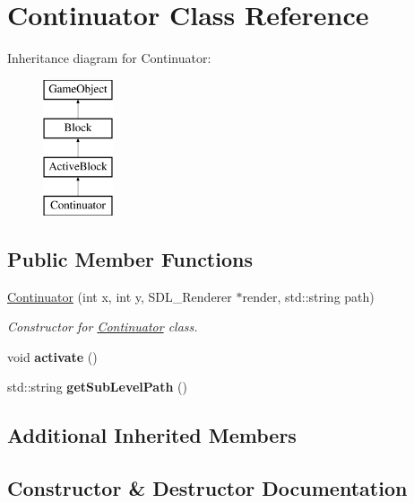 \hypertarget{class_continuator}{}\section{Continuator Class Reference}
\label{class_continuator}
Inheritance diagram for Continuator\+:\begin{figure}[H]
\begin{center}
\leavevmode
\includegraphics[height=4.000000cm]{class_continuator}
\end{center}
\end{figure}
\subsection*{Public Member Functions}
\begin{DoxyCompactItemize}
\item 
\hyperlink{class_continuator_a0983a0dece1cc4bdc524c6d81e0e2564}{Continuator} (int x, int y, S\+D\+L\+\_\+\+Renderer $\ast$render, std\+::string path)
\begin{DoxyCompactList}\small\item\em Constructor for \hyperlink{class_continuator}{Continuator} class. \end{DoxyCompactList}\item 
\hypertarget{class_continuator_a86b4d51415347063e6474297fe9f4656}{}void {\bfseries activate} ()\label{class_continuator_a86b4d51415347063e6474297fe9f4656}

\item 
\hypertarget{class_continuator_a02589158e4fdec4640069abede290848}{}std\+::string {\bfseries get\+Sub\+Level\+Path} ()\label{class_continuator_a02589158e4fdec4640069abede290848}

\end{DoxyCompactItemize}
\subsection*{Additional Inherited Members}


\subsection{Constructor \& Destructor Documentation}
\hypertarget{class_continuator_a0983a0dece1cc4bdc524c6d81e0e2564}{}
